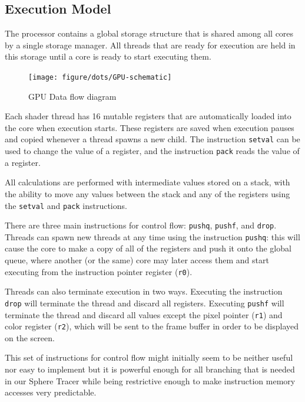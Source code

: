 		\subsection{Execution Model}

			The processor contains a global storage structure that is shared
			among all cores by a single storage manager. All threads that are 
			ready for execution are held in this storage until a core is ready 
			to start executing them.

			\begin{figure}[H]
				\centering
				\caption{ GPU Data flow diagram }
					\texttt{[image: figure/dots/GPU-schematic]} 
				\vspace{-4pt}
			\end{figure}
	
			Each shader thread has 16 mutable registers that are automatically
			loaded into the core when execution starts. These registers are
			saved when execution pauses and copied whenever a thread spawns a 
			new child. The instruction \texttt{setval} can be used to change 
			the value of a register, and the instruction \texttt{pack} reads 
			the value of a register.

			All calculations are performed with intermediate values stored on a
			stack, with the ability to move any values between the stack and
			any of the registers using the \texttt{setval} and \texttt{pack}
			instructions.

			There are three main instructions for control flow: \texttt{pushq},
			\texttt{pushf}, and \texttt{drop}. Threads can spawn new threads at
			any time using the instruction \texttt{pushq}: this will cause the
			core to make a copy of all of the registers and push it onto the
			global queue, where another (or the same) core may later access
			them and start executing from the instruction pointer register
			(\texttt{r0}).

			Threads can also terminate execution in two ways. Executing the
			instruction \texttt{drop} will terminate the thread and discard all
			registers. Executing \texttt{pushf} will terminate the thread and
			discard all values except the pixel pointer (\texttt{r1}) and color
			register (\texttt{r2}), which will be sent to the frame buffer in
			order to be displayed on the screen.

			This set of instructions for control flow might initially seem to be
			neither useful nor easy to implement but it is powerful enough for all
			branching that is needed in our Sphere Tracer while being restrictive
			enough to make instruction memory accesses very predictable.

